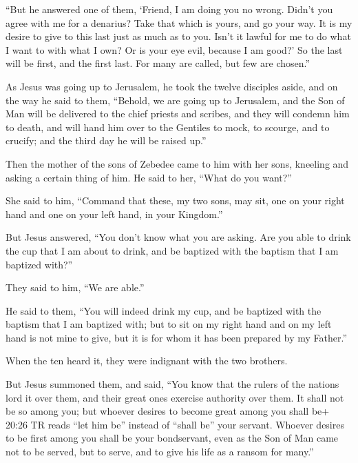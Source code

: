  ``But he answered one of them, `Friend, I am doing you no
wrong. Didn't you agree with me for a denarius?  Take that
which is yours, and go your way. It is my desire to give to this last
just as much as to you.  Isn't it lawful for me to do what
I want to with what I own? Or is your eye evil, because I am good?'
 So the last will be first, and the first last. For many
are called, but few are chosen.''

 As Jesus was going up to Jerusalem, he took the twelve
disciples aside, and on the way he said to them,  ``Behold,
we are going up to Jerusalem, and the Son of Man will be delivered to
the chief priests and scribes, and they will condemn him to death,
 and will hand him over to the Gentiles to mock, to
scourge, and to crucify; and the third day he will be raised up.''

 Then the mother of the sons of Zebedee came to him with
her sons, kneeling and asking a certain thing of him.  He
said to her, ``What do you want?''

She said to him, ``Command that these, my two sons, may sit, one on your
right hand and one on your left hand, in your Kingdom.''

 But Jesus answered, ``You don't know what you are asking.
Are you able to drink the cup that I am about to drink, and be baptized
with the baptism that I am baptized with?''

They said to him, ``We are able.''

 He said to them, ``You will indeed drink my cup, and be
baptized with the baptism that I am baptized with; but to sit on my
right hand and on my left hand is not mine to give, but it is for whom
it has been prepared by my Father.''

 When the ten heard it, they were indignant with the two
brothers.

 But Jesus summoned them, and said, ``You know that the
rulers of the nations lord it over them, and their great ones exercise
authority over them.  It shall not be so among you; but
whoever desires to become great among you shall be+ 20:26 TR reads ``let
him be'' instead of ``shall be'' your servant.  Whoever
desires to be first among you shall be your bondservant, 
even as the Son of Man came not to be served, but to serve, and to give
his life as a ransom for many.''

